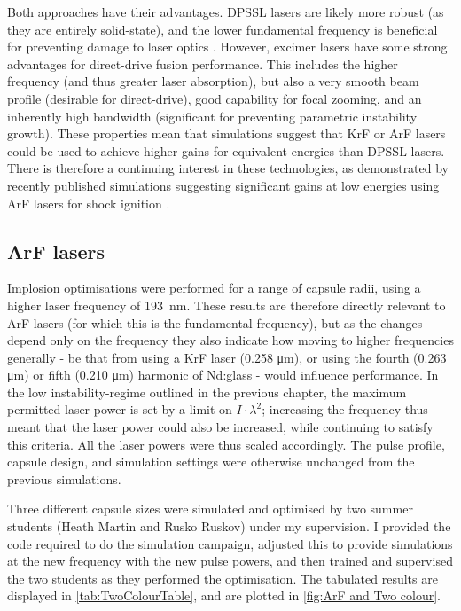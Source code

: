 Both approaches have their advantages. DPSSL lasers are likely more robust (as they are entirely solid-state), and the lower fundamental frequency is beneficial for preventing damage to laser optics \cite{Sethian2010}. However, excimer lasers have some strong advantages for direct-drive fusion performance. This includes the higher frequency (and thus greater laser absorption), but also a very smooth beam profile (desirable for direct-drive), good capability for focal zooming, and an inherently high bandwidth (significant for preventing parametric instability growth). These properties mean that simulations suggest that KrF or ArF lasers could be used to achieve higher gains for equivalent energies than DPSSL lasers. There is therefore a continuing interest in these technologies, as demonstrated by recently published simulations suggesting significant gains at low energies using ArF lasers for shock ignition \cite{Obenschain2020}.

\subsection{ArF lasers}

Implosion optimisations were performed for a range of capsule radii, using a higher laser frequency of 193~nm. These results are therefore directly relevant to ArF lasers (for which this is the fundamental frequency), but as the changes depend only on the frequency they also indicate how moving to higher frequencies generally - be that from using a KrF laser (0.258 \unit{\micro\meter}), or using the fourth (0.263 \unit{\micro\meter}) or fifth (0.210 \unit{\micro\meter}) harmonic of Nd:glass - would influence performance. In the low instability-regime outlined in the previous chapter, the maximum permitted laser power is set by a limit on $I \cdot \lambda^2$; increasing the frequency thus meant that the laser power could also be increased, while continuing to satisfy this criteria. All the laser powers were thus scaled accordingly. The pulse profile, capsule design, and simulation settings were otherwise unchanged from the previous simulations.

Three different capsule sizes were simulated and optimised by two summer students (Heath Martin and Rusko Ruskov) under my supervision. I provided the code required to do the simulation campaign, adjusted this to provide simulations at the new frequency with the new pulse powers, and then trained and supervised the two students as they performed the optimisation. The tabulated results are displayed in \ref{tab:TwoColourTable}, and are plotted in \ref{fig:ArF and Two colour}.

